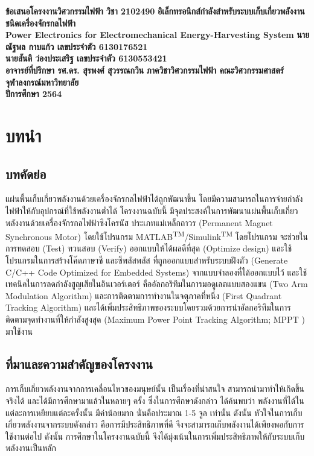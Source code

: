 \documentclass[11pt,a4paper]{article}
\begin{document}
\thispagestyle{empty}
\begin{center}
    \doublespacing
    {\LARGE \bf ข้อเสนอโครงงานวิศวกรรมไฟฟ้า วิชา 2102490}
    \vfill
    {
        \LARGE \bf
        อิเล็กทรอนิกส์กำลังสำหรับระบบเก็บเกี่ยวพลังงานชนิดเครื่องจักรกลไฟฟ้า \\[2ex]
        Power Electronics for Electromechanical Energy-Harvesting System
    }
    \vfill
    {\LARGE \bf นายณัฐพล กาบแก้ว เลขประจำตัว 6130176521}\\[2ex]
    {\LARGE \bf นายสันติ ว่องประเสริฐ เลขประจำตัว 6130553421}\\[2ex]
    {\LARGE \bf อาจารย์ที่ปรึกษา รศ.ดร. สุรพงศ์ สุวรรณกวิน}
    \vfill
    {\LARGE \bf ภาควิชาวิศวกรรมไฟฟ้า คณะวิศวกรรมศาสตร์}\\[2ex]
    {\LARGE \bf จุฬาลงกรณ์มหาวิทยาลัย}\\[2ex]
    {\LARGE \bf ปีการศึกษา 2564}
\end{center}

\newpage
\thispagestyle{empty}
\tableofcontents

\newpage
\setcounter{page}{1}
\section{บทนำ}
\subsection{บทคัดย่อ}
แผ่นพื้นเก็บเกี่ยวพลังงานด้วยเครื่องจักรกลไฟฟ้าได้ถูกพัฒนาขึ้น โดยมีความสามารถในการจ่ายกำลังไฟฟ้าให้กับอุปกรณ์ที่ใช้พลังงานต่ำได้ โครงงานฉบับนี้ มีจุดประสงค์ในการพัฒนาแผ่นพื้นเก็บเกี่ยวพลังงานด้วยเครื่องจักรกลไฟฟ้าซิงโครนัส ประเภทแม่เหล็กถาวร (Permanent Magnet Synchronous Motor) โดยใช้โปรแกรม MATLAB\textsuperscript{TM}/Simulink\textsuperscript{TM} โดยโปรแกรม จะช่วยในการทดสอบ (Test) ทวนสอบ (Verify) ออกแบบให้ได้ผลดีที่สุด (Optimize design) และใช้โปรแกรมในการสร้างโค๊ดภาษาซี และซีพลัสพลัส ที่ถูกออกแบบสำหรับระบบฝังตัว (Generate C/C++ Code Optimized for Embedded Systems)  จากแบบจำลองที่ได้ออกแบบไว้ และใช้เทคนิคในการลดกำลังสูญเสียในอินเวอร์เตอร์ คืออัลกอริทึมในการมอดูเลตแบบสองแขน (Two Arm Modulation Algorithm) และการติดตามการทำงานในจตุภาคที่หนึ่ง (First Quadrant Tracking Algorithm) และได้เพิ่มประสิทธิภาพของระบบโดยรวมด้วยการนำอัลกอริทึมในการติดตามจุดทำงานที่ให้กำลังสูงสุด (Maximum Power Point Tracking Algorithm; MPPT ) มาใช้งาน

\subsection{ที่มาและความสำคัญของโครงงาน}
การเก็บเกี่ยวพลังงานจากการเคลื่อนไหวของมนุษย์นั้น เป็นเรื่องที่น่าสนใจ สามารถนำมาทำให้เกิดขึ้นจริงได้ และได้มีการศึกษามาแล้วในหลายๆ ครั้ง \cite{biomech} \cite{GpH:01} ซึ่งในการศึกษาดังกล่าว ได้ค้นพบว่า พลังงานที่ได้ในแต่ละการเหยียบแต่ละครั้งนั้น มีค่าน้อยมาก นั่นคือประมาณ 1-5 จูล เท่านั้น ดังนั้น หัวใจในการเก็บเกี่ยวพลังงานจากระบบดังกล่าว คือการมีประสิทธิภาพที่ดี จึงจะสามารถเก็บพลังงานได้เพียงพอกับการใช้งานต่อไป ดังนั้น การศึกษาในโครงงานฉบับนี้ จึงได้มุ่งเน้นในการเพิ่มประสิทธิภาพให้กับระบบเก็บพลังงานเป็นหลัก
\end{document}
